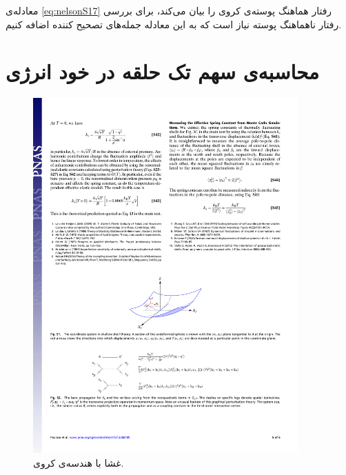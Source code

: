 معادله‌ی \ref{eq:nelsonS17}
 رفتار هماهنگ پوسته‌ی کروی را بیان می‌کند، برای بررسی رفتار ناهماهنگ پوسته نیاز است که به این معادله جمله‌های تصحیح کننده اضافه کنیم.
 \section{محاسبه‌ی سهم تک حلقه در خود انرژی}
 \begin{figure}[h]
\begin{center}
\includegraphics[width=4in]{Figs/nelsonS2}
\caption{
غشا با هندسه‌ی کروی.
}
\label{fig:nelsonS2}
\end{center}
\end{figure}

